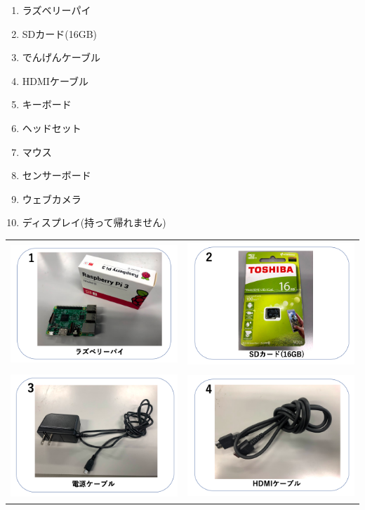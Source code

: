 \documentclass[a4paper,12pt]{jarticle}
\begin{document}
\bigskip

\begin{enumerate}
\item ラズベリーパイ
\item SDカード(16GB)
\item でんげんケーブル
\item HDMIケーブル
\item キーボード
\item ヘッドセット
\item マウス
\item センサーボード
\item ウェブカメラ
\item ディスプレイ(持って帰れません)
\end{enumerate}
\clearpage

\begin{tabular}{cc}
\includegraphics[width=6.488cm,height=4.697cm]{textbook-img009.png}
	&
\includegraphics[width=6.488cm,height=4.697cm]{textbook-img010.png} \\

\includegraphics[width=6.488cm,height=4.697cm]{textbook-img007.png}
	&
\includegraphics[width=6.488cm,height=4.697cm]{textbook-img008.png} \\


\end{tabular}
\end{document}
